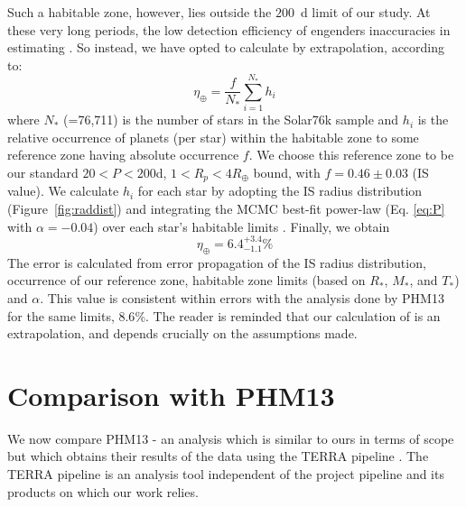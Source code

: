 Such a habitable zone, however, lies outside the $200$~d limit of
our study. At these very long periods, the low detection efficiency of
\kep{} engenders inaccuracies in estimating \ee{}. So instead, we have
opted to calculate \ee{} by extrapolation, according to:
\begin{equation}
\eta_{\oplus} = \frac{f}{N_*}\sum\limits_{i=1}^{N_*} h_i
\end{equation}
where $N_*$ (=76,711) is the number of stars in the Solar76k
sample and $h_i$ is the relative occurrence of planets (per star)
within the habitable zone to some reference zone having absolute
occurrence $f$.  We choose this reference zone to be our standard $20 < P <
200$d, $1 < R_p < 4 R_\oplus$ bound, with $f=0.46 \pm 0.03$ (IS
value). We calculate $h_i$ for each star by adopting the IS
radius distribution (Figure~\ref{fig:raddist}) and integrating
the MCMC best-fit power-law (Eq. \ref{eq:P} with $\alpha=-0.04$) over
each star's habitable limits \citep{Kopparapu2013a}.  Finally, we obtain
\begin{equation}
\eta_{\oplus} = 6.4^{+3.4}_{-1.1} \%
\end{equation}
The error is calculated from error propagation of the IS radius
distribution, occurrence of our reference zone, habitable zone limits 
(based on $R_*$, $M_*$, and $T_*$) and $\alpha$.  
This value is consistent within errors with
the analysis done by PHM13 for the same \citet{Kopparapu2013a} limits,
$8.6$\%. The reader is reminded that our calculation of \ee{} is an
extrapolation, and depends crucially on the assumptions made.

\section{Comparison with PHM13}
\label{sec:petcomp}

We now compare PHM13 - an analysis which
is similar to ours in terms of scope but which obtains their results
of the \kep{} data using the TERRA pipeline \citep{Petigura2013}. The TERRA 
pipeline is an analysis tool independent of the \kep{} project pipeline and its
products on which our work relies.  


